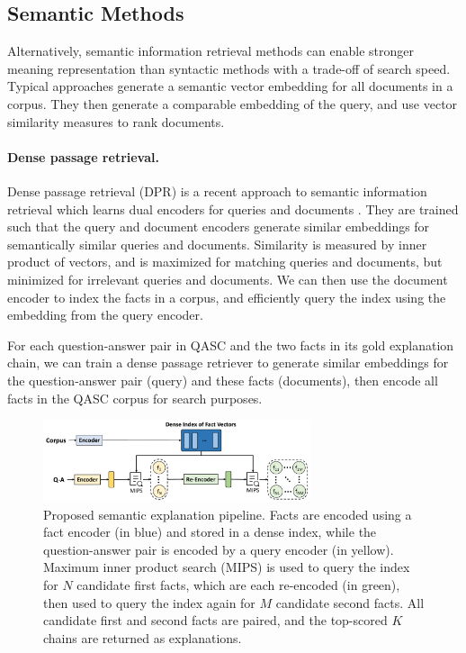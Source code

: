 \documentclass[letterpaper]{article} %
\begin{document}
\subsection{Semantic Methods}\label{sec:semantic}
Alternatively, semantic information retrieval methods can enable stronger meaning representation than syntactic methods with a trade-off of search speed. Typical approaches generate a semantic vector embedding for all documents in a corpus. They then generate a comparable embedding of the query, and use vector similarity measures to rank documents.

\paragraph{Dense passage retrieval.}
Dense passage retrieval (DPR) is a recent approach to semantic information retrieval which learns dual encoders for queries and documents \cite{karpukhin-etal-2020-dense}. They are trained such that the query and document encoders generate similar embeddings for semantically similar queries and documents. Similarity is measured by inner product of vectors, and is maximized for matching queries and documents, but minimized for irrelevant queries and documents.
We can then use the document encoder to index the facts in a corpus, and efficiently query the index using the embedding from the query encoder.

For each question-answer pair in QASC and the two facts in its gold explanation chain, we can train a dense passage retriever to generate similar embeddings for the question-answer pair (query) and these facts (documents), then encode all facts in the QASC corpus for search purposes. %

\begin{figure}
    \centering
    \includegraphics[width=0.7\textwidth]{semantic_pipeline.pdf}
    \caption{Proposed semantic explanation pipeline. Facts are encoded using a fact encoder (in blue) and stored in a dense index, while the question-answer pair is encoded by a query encoder (in yellow). Maximum inner product search (MIPS) is used to query the index for $N$ candidate first facts, which are each re-encoded (in green), then used to query the index again for $M$ candidate second facts. All candidate first and second facts are paired, and the top-scored $K$ chains are returned as explanations. }
    \label{fig:semantic expl pipeline}
\end{figure}
\end{document}
